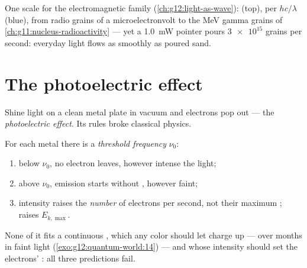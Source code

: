 \begin{omfigure}

{\small One scale for the electromagnetic family
(\cref{ch:g12:light-as-wave}):  (top),  per 
$hc/\lambda$ (blue), from radio grains of a microelectronvolt to the
\unit{MeV} gamma grains of \cref{ch:g11:nucleus-radioactivity} --- yet a
\qty{1.0}{mW} pointer pours $\num{3e15}$ grains per second: everyday
light flows as smoothly as poured sand.}
\end{omfigure}

\section{The photoelectric effect}

Shine light on a clean metal plate in vacuum and electrons pop out --- the
\emph{photoelectric effect}. Its rules broke classical physics.

\begin{proposition}\label{prop:g12:quantum-world:facts}
For each metal there is a \emph{threshold frequency} $\nu_0$:
\begin{enumerate}
  \item below $\nu_0$, no electron leaves, however intense the light;
  \item above $\nu_0$, emission starts without , however faint;
  \item intensity raises the \emph{number} of electrons per second, not
        their maximum ;  raises $E_{k,\max}$.
\end{enumerate}
None of it fits a continuous , which any color should let charge up ---
over months in faint light (\cref{exo:g12:quantum-world:14}) --- and whose
intensity should set the electrons' : all three predictions fail.
\end{proposition}
\admitted

